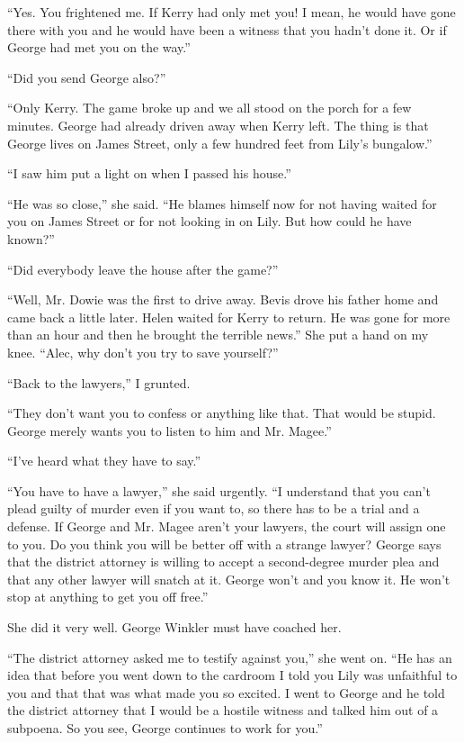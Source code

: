 {“Yes. You frightened me. If Kerry had only met you! I mean, he would have gone there with you and he would have been a witness that you hadn’t done it. Or if George had met you on the way.”

“Did you send George also?”

“Only Kerry. The game broke up and we all stood on the porch for a few minutes. George had already driven away when Kerry left. The thing is that George lives on James Street, only a few hundred feet from Lily’s bungalow.”

“I saw him put a light on when I passed his house.”

“He was so close,” she said. “He blames himself now for not having waited for you on James Street or for not looking in on Lily. But how could he have known?”

“Did everybody leave the house after the game?”

“Well, Mr. Dowie was the first to drive away. Bevis drove his father home and came back a little later. Helen waited for Kerry to return. He was gone for more than an hour and then he brought the terrible news.” She put a hand on my knee. “Alec, why don’t you try to save yourself?”

“Back to the lawyers,” I grunted.

“They don’t want you to confess or anything like that. That would be stupid. George merely wants you to listen to him and Mr. Magee.”

“I’ve heard what they have to say.”

“You have to have a lawyer,” she said urgently. “I understand that you can’t plead guilty of murder even if you want to, so there has to be a trial and a defense. If George and Mr. Magee aren’t your lawyers, the court will assign one to you. Do you think you will be better off with a strange lawyer? George says that the district attorney is willing to accept a second-degree murder plea and that any other lawyer will snatch at it. George won’t and you know it. He won’t stop at anything to get you off free.”

She did it very well. George Winkler must have coached her.

“The district attorney asked me to testify against you,” she went on. “He has an idea that before you went down to the cardroom I told you Lily was unfaithful to you and that that was what made you so excited. I went to George and he told the district attorney that I would be a hostile witness and talked him out of a subpoena. So you see, George continues to work for you.”

}
